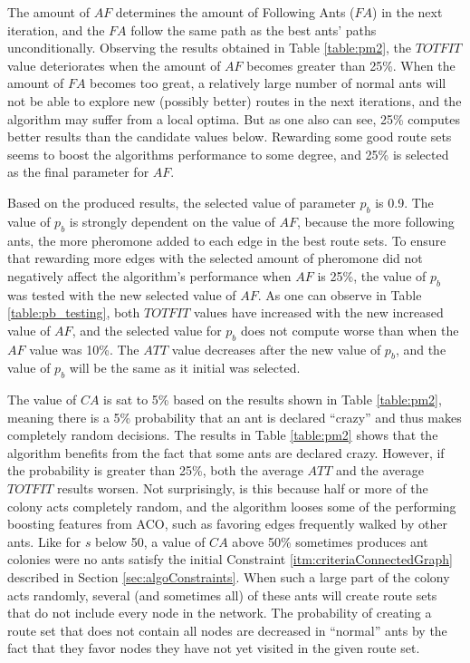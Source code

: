 The amount of $AF$ determines the amount of Following Ants ($FA$) in the next iteration, and the $FA$ follow the same path as the best ants' paths unconditionally. Observing the results obtained in Table \vref{table:pm2}, the $TOTFIT$ value deteriorates when the amount of $AF$ becomes greater than 25\%. When the amount of $FA$ becomes too great, a relatively large number of normal ants will not be able to explore new (possibly better) routes in the next iterations, and the algorithm may suffer from a local optima. But as one also can see, 25\% computes better results than the candidate values below. Rewarding some good route sets seems to boost the algorithms performance to some degree, and 25\% is selected as the final parameter for $AF$.

Based on the produced results, the selected value of parameter $p_b$ is 0.9. The value of $p_b$ is strongly dependent on the value of $AF$, because the more following ants, the more pheromone added to each edge in the best route sets. To ensure that rewarding more edges with the selected amount of pheromone did not negatively affect the algorithm's performance when $AF$ is 25\%, the value of $p_b$ was tested with the new selected value of $AF$. As one can observe in Table \vref{table:pb_testing}, both $TOTFIT$ values have increased with the new increased value of $AF$, and the selected value for $p_b$ does not compute worse than when the $AF$ value was 10\%. The $ATT$ value decreases after the new value of $p_b$, and the value of $p_b$ will be the same as it initial was selected. 

The value of $CA$ is sat to 5\% based on the results shown in Table \vref{table:pm2}, meaning there is a 5\% probability that an ant is declared ``crazy'' and thus makes completely random decisions. The results in Table \vref{table:pm2} shows that the algorithm benefits from the fact that some ants are declared crazy. However, if the probability is greater than 25\%, both the average $ATT$ and the average $TOTFIT$ results worsen. Not surprisingly, is this because half or more of the colony acts completely random, and the algorithm looses some of the performing boosting features from ACO, such as favoring edges frequently walked by other ants. Like for $s$ below 50, a value of $CA$ above 50\% sometimes produces ant colonies were no ants satisfy the initial Constraint \ref{itm:criteriaConnectedGraph} described in Section \vref{sec:algoConstraints}. When such a large part of the colony acts randomly, several (and sometimes all) of these ants will create route sets that do not include every node in the network. The probability of creating a route set that does not contain all nodes are decreased in ``normal'' ants by the fact that they favor nodes they have not yet visited in the given route set.
